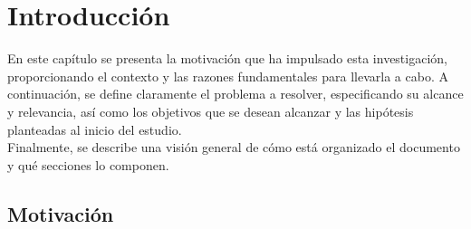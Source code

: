 \documentclass[a4paper, 12pt]{book}
\begin{document}
\tableofcontents 
\cleardoublepage
\listoffigures %
\cleardoublepage
\listoftables %



\cleardoublepage
\chapter{Introducción}
\label{chap:introducción}
\label{sec:intro} %

En este capítulo se presenta la motivación que ha impulsado esta investigación,
proporcionando el contexto y las razones fundamentales para llevarla a cabo. A continuación, 
se define claramente el problema a resolver, especificando su alcance y relevancia, así como 
los objetivos que se desean alcanzar y las hipótesis planteadas al inicio del estudio.
\\Finalmente, se describe una visión general de cómo está organizado el documento y qué secciones lo componen.

\section{Motivación}
\label{sec:motivación}
\end{document}
